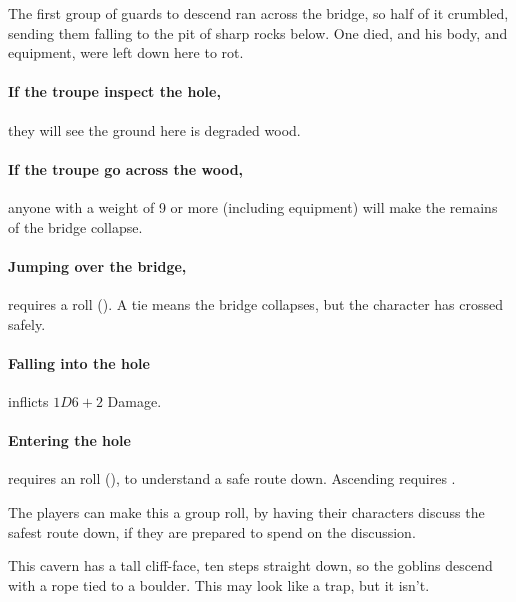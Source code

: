 \begin{multicols}{2}
\begin{exampletext}
  The first group of \glspl{guard} to descend ran across the bridge, so half of it crumbled, sending them falling to the pit of sharp rocks below.
  One died, and his body, and equipment, were left down here to rot.
\end{exampletext}

\paragraph{If the troupe inspect the hole,}
they will see the ground here is degraded wood.

\paragraph{If the troupe go across the wood,}
anyone with a \gls{weight} of 9 or more (including equipment) will make the remains of the bridge collapse.

\paragraph{Jumping over the bridge,}
requires a  roll (\tn[9]).
A tie means the bridge collapses, but the character has crossed safely.

\paragraph{Falling into the hole}
inflicts $1D6+2$ Damage.

\paragraph{Entering the hole}
requires an  roll (\tn[10]), to understand a safe route down.
Ascending requires \tn[12].

The players can make this a group roll, by having their characters discuss the safest route down, if they are prepared to spend  on the discussion.




\begin{exampletext}
  This cavern has a tall cliff-face, ten \glspl{step} straight down, so the goblins descend with a rope tied to a boulder.
  This may look like a trap, but it isn't.
\end{exampletext}


\end{multicols}
